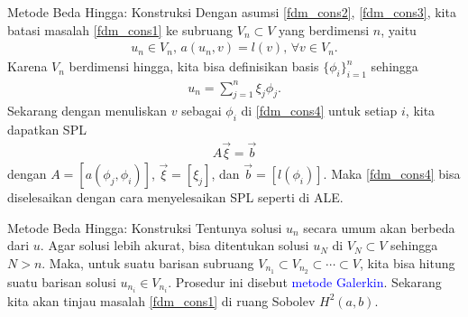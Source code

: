 \documentclass[xcolor={dvipsnames}, 9pt]{beamer}
\renewcommand{\emph}[1]{\textcolor{Blue}{#1}}
\begin{document}
	\begin{frame}{Metode Beda Hingga: Konstruksi}
		Dengan asumsi \eqref{fdm_cons2}, \eqref{fdm_cons3}, kita batasi masalah \eqref{fdm_cons1} ke subruang $V_n\subset V$ yang berdimensi $n$, yaitu
		\begin{align}\label{fdm_cons4}
			u_n\in V_n, \, a(u_n, v) = l(v), \, \forall v\in V_n.
		\end{align}
		Karena $V_n$ berdimensi hingga, kita bisa definisikan basis $\{\phi_i\}_{i=1}^n$ sehingga
		\begin{align*}
			u_n = \sum_{j=1}^{n} \xi_j\phi_j.
		\end{align*}
		Sekarang dengan menuliskan $v$ sebagai $\phi_i$ di \eqref{fdm_cons4} untuk setiap $i$, kita dapatkan SPL
		\begin{align}
			A\vec{\xi} = \vec{b}
		\end{align}
		dengan $A = [a(\phi_j,\phi_i)]$, $\vec{\xi} = [\xi_j]$, dan $\vec{b} = [l(\phi_i)]$. Maka \eqref{fdm_cons4} bisa diselesaikan dengan cara menyelesaikan SPL seperti di ALE.
	\end{frame}
	\begin{frame}{Metode Beda Hingga: Konstruksi}
		Tentunya solusi $u_n$ secara umum akan berbeda dari $u$. Agar solusi lebih akurat, bisa ditentukan solusi $u_N$ di $V_N\subset V$ sehingga $N>n$. Maka, untuk suatu barisan subruang $V_{n_1} \subset V_{n_2} \subset \cdots \subset V$, kita bisa hitung suatu barisan solusi $u_{n_i}\in V_{n_i}$. Prosedur ini disebut \emph{metode Galerkin}. \newline
		Sekarang kita akan tinjau masalah \eqref{fdm_cons1} di ruang Sobolev $H^2(a,b)$.
	\end{frame}
\end{document}
